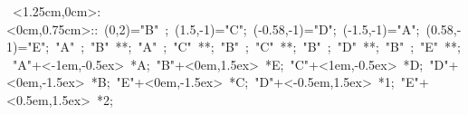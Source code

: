 
\hbox{
\xy    <1.25cm,0cm>:<0cm,0.75cm>::
       (0,2)="B" ; (1.5,-1)="C";  (-0.58,-1)="D";   
	   (-1.5,-1)="A";    (0.58,-1)="E";
	   "A" ; "B" **\dir{-}; 
       "A" ; "C" **\dir{-}; 
       "B" ; "C" **\dir{-}; 
       "B" ; "D" **\dir{-}; 
       "B" ; "E" **\dir{-}; 
       "A"+<-1em,-0.5ex> *{A};
	   "B"+<0em,1.5ex> *{E};
       "C"+<1em,-0.5ex> *{D};
       "D"+<0em,-1.5ex> *{B};
       "E"+<0em,-1.5ex> *{C};
       "D"+<-0.5em,1.5ex> *{1};
       "E"+<0.5em,1.5ex> *{2};
       \endxy}

